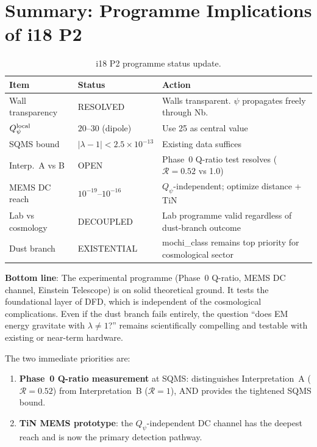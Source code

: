 \documentclass[11pt]{article}
\newcommand{\ee}[1]{\times 10^{#1}}
\newcommand{\Qpsi}{Q_\psi}
\newcommand{\lbone}{|\lambda - 1|}
\theoremstyle{definition}
\theoremstyle{remark}
\begin{document}
\section*{Summary: Programme Implications of i18 P2}

\begin{table}[H]
\centering
\caption{i18 P2 programme status update.}
\renewcommand{\arraystretch}{1.3}
\begin{tabular}{@{}p{4.5cm}p{3cm}p{4.5cm}@{}}
\toprule
\textbf{Item} & \textbf{Status} & \textbf{Action} \\
\midrule
\rowcolor{rowok}
Wall transparency & RESOLVED & Walls transparent. $\psi$
  propagates freely through Nb. \\
\rowcolor{rowok}
$\Qpsi^{\rm local}$ & $20$--$30$ (dipole) & Use 25 as central value \\
\rowcolor{rowok}
SQMS bound & $\lbone < 2.5\ee{-13}$ & Existing data suffices \\
\rowcolor{rowhi}
Interp.\ A vs B & OPEN & Phase~0 Q-ratio test resolves
  ($\mathcal{R} = 0.52$ vs 1.0) \\
\rowcolor{rowok}
MEMS DC reach & $10^{-19}$--$10^{-16}$ & $\Qpsi$-independent;
  optimize distance + TiN \\
\rowcolor{rowok}
Lab vs cosmology & DECOUPLED & Lab programme valid regardless
  of dust-branch outcome \\
\rowcolor{rowhi}
Dust branch & EXISTENTIAL & mochi\_class remains top priority
  for cosmological sector \\
\bottomrule
\end{tabular}
\end{table}

\textbf{Bottom line}: The experimental programme (Phase~0 Q-ratio,
MEMS DC channel, Einstein Telescope) is on solid theoretical ground.
It tests the foundational layer of DFD, which is independent of the
cosmological complications. Even if the dust branch fails entirely,
the question ``does EM energy gravitate with $\lambda \neq 1$?'' remains
scientifically compelling and testable with existing or near-term hardware.

The two immediate priorities are:
\begin{enumerate}[nosep]
\item \textbf{Phase~0 Q-ratio measurement} at SQMS: distinguishes
  Interpretation~A ($\mathcal{R} = 0.52$) from Interpretation~B
  ($\mathcal{R} = 1$), AND provides the tightened SQMS bound.
\item \textbf{TiN MEMS prototype}: the $\Qpsi$-independent DC channel
  has the deepest reach and is now the primary detection pathway.
\end{enumerate}
\end{document}
